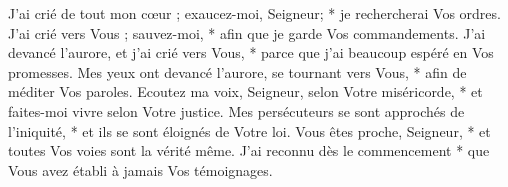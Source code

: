 J'ai crié de tout mon cœur ; exaucez-moi, Seigneur; * je rechercherai Vos ordres.
\versseparator
J'ai crié vers Vous ; sauvez-moi, * afin que je garde Vos commandements.
\versseparator
J'ai devancé l'aurore, et j'ai crié vers Vous, * parce que j'ai beaucoup espéré en Vos promesses.
\versseparator
Mes yeux ont devancé l'aurore, se tournant vers Vous, * afin de méditer Vos paroles.
\versseparator
Ecoutez ma voix, Seigneur, selon Votre miséricorde, * et faites-moi vivre selon Votre justice.
\versseparator
Mes persécuteurs se sont approchés de l'iniquité, * et ils se sont éloignés de Votre loi.
\versseparator
Vous êtes proche, Seigneur, * et toutes Vos voies sont la vérité même.
\versseparator
J'ai reconnu dès le commencement * que Vous avez établi à jamais Vos témoignages.